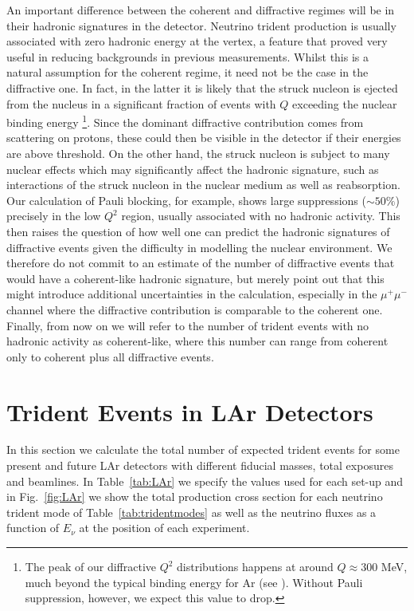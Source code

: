 An important difference between the coherent and diffractive regimes will be in their hadronic signatures in the detector. Neutrino trident production is usually associated with zero hadronic energy at the vertex, a feature that proved very useful in reducing backgrounds in previous measurements. Whilst this is a natural assumption for the coherent regime, it need not be the case in the diffractive one. In fact, in the latter it is likely that the struck nucleon is ejected from the nucleus in a significant fraction of events with $Q$ exceeding the nuclear binding energy
%
\footnote{The peak of our diffractive $Q^2$ distributions happens at around $Q \approx 300$ MeV, much beyond the typical binding energy for Ar (see ). Without Pauli suppression, however, we expect this value to drop.}. Since the dominant diffractive contribution comes from scattering on protons, these could then be visible in the detector if their energies are above threshold. On the other hand, the struck nucleon is subject to many nuclear effects which may significantly affect the hadronic signature, such as interactions of the struck nucleon in the nuclear medium as well as reabsorption. Our calculation of Pauli blocking, for example, shows large suppressions ($\sim 50\%$) precisely in the low $Q^2$ region, usually associated with no hadronic activity. This then raises the question of how well one can predict the hadronic signatures of diffractive events given the difficulty in modelling the nuclear environment. We therefore do not commit to an estimate of the number of diffractive events that would have a coherent-like hadronic signature, but merely point out that this might introduce additional uncertainties in the calculation, especially in the $\mu^+ \mu^-$ channel where the diffractive contribution is comparable to the coherent one. Finally, from now on we will refer to the number of trident events with no hadronic activity as coherent-like, where this number can range from coherent only to coherent plus all diffractive events. 



\section{Trident Events in LAr Detectors}
\label{sec:LAr}

In this section we calculate the total number of expected  trident events for some present and future LAr detectors with different fiducial masses, total exposures and beamlines. In Table~\ref{tab:LAr} we specify the values used for each set-up and in Fig.~\ref{fig:LAr} we show the total production cross section for each neutrino trident mode of Table~\ref{tab:tridentmodes}
as well as the neutrino fluxes as a function of $E_\nu$ at the position of each experiment.  

